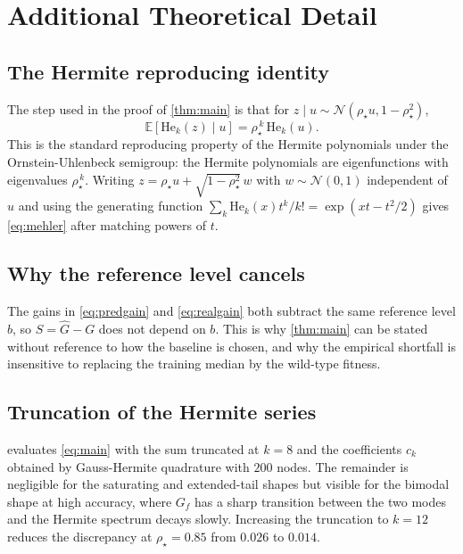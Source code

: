 \documentclass{article}
\theoremstyle{plain}
\theoremstyle{definition}
\newcommand{\Exp}{\mathbb{E}}
\newcommand{\He}{\mathrm{He}}
\newcommand{\Normal}{\mathcal{N}}
\begin{document}



\newpage
\appendix
\onecolumn

\section{Additional Theoretical Detail}
\label{app:theory}

\subsection{The Hermite reproducing identity}
\label{app:mehler}

The step used in the proof of \cref{thm:main} is that for $z \mid u \sim
\Normal(\rho_\star u, 1-\rho_\star^2)$,
\begin{equation}
\Exp\!\left[\He_k(z) \mid u\right] = \rho_\star^{\,k}\,\He_k(u).
\label{eq:mehler}
\end{equation}
This is the standard reproducing property of the Hermite polynomials under the
Ornstein-Uhlenbeck semigroup: the Hermite polynomials are eigenfunctions with
eigenvalues $\rho_\star^{\,k}$. Writing $z = \rho_\star u + \sqrt{1-\rho_\star^2}\,w$
with $w \sim \Normal(0,1)$ independent of $u$ and using the generating function
$\sum_k \He_k(x) t^k / k! = \exp(xt - t^2/2)$ gives \cref{eq:mehler} after matching
powers of $t$.

\subsection{Why the reference level cancels}
\label{app:base}

The gains in \cref{eq:predgain} and \cref{eq:realgain} both subtract the same reference
level $b$, so $S = \hat{G} - G$ does not depend on $b$. This is why
\cref{thm:main} can be stated without reference to how the baseline is chosen, and why
the empirical shortfall is insensitive to replacing the training median by the
wild-type fitness.

\subsection{Truncation of the Hermite series}
\label{app:trunc}

 evaluates \cref{eq:main} with the sum truncated at $k = 8$ and the
coefficients $c_k$ obtained by Gauss-Hermite quadrature with $200$ nodes. The remainder
is negligible for the saturating and extended-tail shapes but visible for the bimodal
shape at high accuracy, where $G_{\!f}$ has a sharp transition between the two modes and
the Hermite spectrum decays slowly. Increasing the truncation to $k = 12$ reduces the
discrepancy at $\rho_\star = 0.85$ from $0.026$ to $0.014$.
\end{document}
